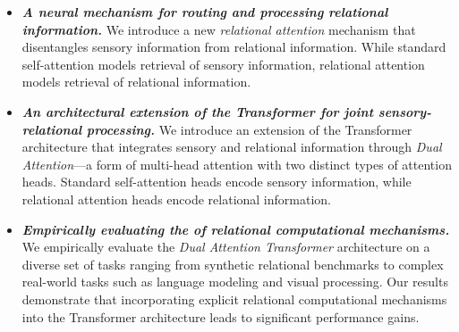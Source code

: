 \begin{itemize}[left=5pt]
  \item \textit{\textbf{A neural mechanism for routing and processing relational information.}} We introduce a new \textit{relational attention} mechanism that disentangles sensory information from relational information. While standard self-attention models retrieval of sensory information, relational attention models retrieval of relational information.
  \item \textit{\textbf{An architectural extension of the Transformer for joint sensory-relational processing.}} We introduce an extension of the Transformer architecture that integrates sensory and relational information through \textit{Dual Attention}---a form of multi-head attention with two distinct types of attention heads. Standard self-attention heads encode sensory information, while relational attention heads encode relational information.
  \item \textit{\textbf{Empirically evaluating the  of relational computational mechanisms.}} We empirically evaluate the \textit{Dual Attention Transformer} architecture on a diverse set of tasks ranging from synthetic relational benchmarks to complex real-world tasks such as language modeling and visual processing. Our results demonstrate that incorporating explicit relational computational mechanisms into the Transformer architecture leads to significant performance gains.
\end{itemize}

